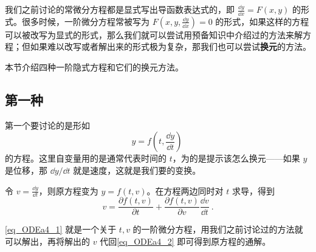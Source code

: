 

我们之前讨论的常微分方程都是显式写出导函数表达式的，即 $\frac{\dd y}{\dd x}=F(x, y)$ 的形式。很多时候，一阶微分方程常被写为 $F(x, y, \frac{\dd y}{\dd x})=0$ 的形式，如果这样的方程可以被改写为显式的形式，那么我们就可以尝试用预备知识中介绍过的方法来解方程；但如果难以改写或者解出来的形式极为复杂，那我们也可以尝试\textbf{换元}的方法。

本节介绍四种一阶隐式方程和它们的换元方法。

\subsection{第一种}

第一个要讨论的是形如
\begin{equation}\label{eq_ODEa4_2}
y=f(t, \frac{\dd y}{\dd t})~
\end{equation}
的方程。这里自变量用的是通常代表时间的 $t$，为的是提示该怎么换元——如果 $y$ 是位移，那 $\dd y/\dd t$ 就是速度，这就是我们要的变换。

令 $v=\frac{\dd y}{\dd t}$，则原方程变为 $y=f(t, v)$。在方程两边同时对 $t$ 求导，得到
\begin{equation}\label{eq_ODEa4_1}
v=\frac{\partial f(t, v)}{\partial t}+\frac{\partial f(t, v)}{\partial v}\frac{\dd v}{\dd t}~.
\end{equation}

\autoref{eq_ODEa4_1} 就是一个关于 $t, v$ 的一阶微分方程，用我们之前讨论过的方法就可以解出，再将解出的 $v$ 代回\autoref{eq_ODEa4_2} 即可得到原方程的通解。

